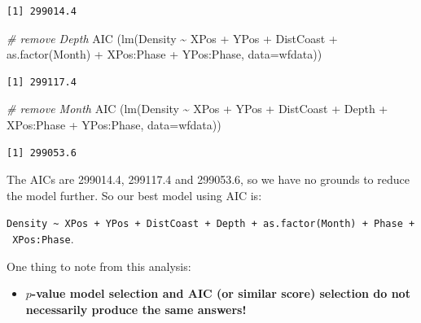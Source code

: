 \documentclass[
  oneside]{krantz}
\newenvironment{Shaded}{\begin{snugshade}}{\end{snugshade}}
\newcommand{\AttributeTok}[1]{\textcolor[rgb]{0.77,0.63,0.00}{#1}}
\newcommand{\CommentTok}[1]{\textcolor[rgb]{0.56,0.35,0.01}{\textit{#1}}}
\newcommand{\FunctionTok}[1]{\textcolor[rgb]{0.00,0.00,0.00}{#1}}
\newcommand{\NormalTok}[1]{#1}
\newcommand{\SpecialCharTok}[1]{\textcolor[rgb]{0.00,0.00,0.00}{#1}}
\providecommand{\tightlist}{%
  \setlength{\itemsep}{0pt}\setlength{\parskip}{0pt}}
\begin{document}
\begin{verbatim}
[1] 299014.4
\end{verbatim}

\begin{Shaded}
\begin{Highlighting}[]
\CommentTok{\# remove Depth}
\FunctionTok{AIC}\NormalTok{ (}\FunctionTok{lm}\NormalTok{(Density }\SpecialCharTok{\textasciitilde{}}\NormalTok{ XPos }\SpecialCharTok{+}\NormalTok{ YPos }\SpecialCharTok{+}\NormalTok{ DistCoast }\SpecialCharTok{+} \FunctionTok{as.factor}\NormalTok{(Month) }\SpecialCharTok{+} 
\NormalTok{          XPos}\SpecialCharTok{:}\NormalTok{Phase }\SpecialCharTok{+}\NormalTok{ YPos}\SpecialCharTok{:}\NormalTok{Phase, }\AttributeTok{data=}\NormalTok{wfdata))}
\end{Highlighting}
\end{Shaded}

\begin{verbatim}
[1] 299117.4
\end{verbatim}

\begin{Shaded}
\begin{Highlighting}[]
\CommentTok{\# remove Month}
\FunctionTok{AIC}\NormalTok{ (}\FunctionTok{lm}\NormalTok{(Density }\SpecialCharTok{\textasciitilde{}}\NormalTok{ XPos }\SpecialCharTok{+}\NormalTok{ YPos }\SpecialCharTok{+}\NormalTok{ DistCoast }\SpecialCharTok{+}\NormalTok{ Depth }\SpecialCharTok{+} 
\NormalTok{          XPos}\SpecialCharTok{:}\NormalTok{Phase }\SpecialCharTok{+}\NormalTok{ YPos}\SpecialCharTok{:}\NormalTok{Phase, }\AttributeTok{data=}\NormalTok{wfdata))}
\end{Highlighting}
\end{Shaded}

\begin{verbatim}
[1] 299053.6
\end{verbatim}

\normalsize

The AICs are 299014.4, 299117.4 and 299053.6, so we have no grounds to reduce the model further. So our best model using AIC is:

\texttt{Density\ \textasciitilde{}\ XPos\ +\ YPos\ +\ DistCoast\ +\ Depth\ +\ as.factor(Month)\ +\ Phase\ +\ XPos:Phase}.

One thing to note from this analysis:

\begin{itemize}
\tightlist
\item
  \textbf{\(p\)-value model selection and AIC (or similar score) selection do not necessarily produce the same answers!}
\end{itemize}
\end{document}
